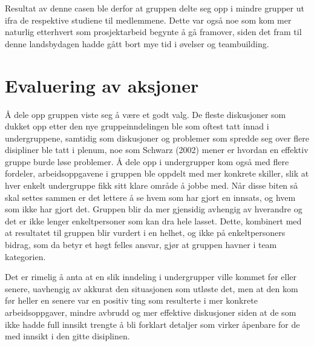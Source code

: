 Resultat av denne casen ble derfor at gruppen delte seg opp i mindre grupper ut ifra de respektive studiene til medlemmene. Dette var også noe som kom mer naturlig etterhvert som prosjektarbeid begynte å gå framover, siden det fram til denne landsbydagen hadde gått bort mye tid i øvelser og teambuilding.

\section{Evaluering av aksjoner}
Å dele opp gruppen viste seg å være et godt valg. De fleste diskusjoner som dukket opp etter den nye gruppeinndelingen ble som oftest tatt innad i undergruppene, samtidig som diskusjoner og problemer som spredde seg over flere disipliner ble tatt i plenum, noe som Schwarz (2002) mener er hvordan en effektiv gruppe burde løse problemer. \cite{Artikkel3} Å dele opp i undergrupper kom også med flere fordeler, arbeidsoppgavene i gruppen ble oppdelt med mer konkrete skiller, slik at hver enkelt undergruppe fikk sitt klare område å jobbe med. Når disse biten så skal settes sammen er det lettere å se hvem som har gjort en innsats, og hvem som ikke har gjort det. Gruppen blir da mer gjensidig avhengig av hverandre og det er ikke lenger enkeltpersoner som kan dra hele lasset. Dette, kombinert med at resultatet til gruppen blir vurdert i en helhet, og ikke på enkeltpersoners bidrag, som da betyr et høgt felles ansvar, gjør at gruppen havner i team kategorien. \cite{Artikkel4}


Det er rimelig å anta at en slik inndeling i undergrupper ville kommet før eller senere, uavhengig av akkurat den situasjonen som utløste det, men at den kom før heller en senere var en positiv ting som resulterte i mer konkrete arbeidsoppgaver, mindre avbrudd og mer effektive diskusjoner siden at de som ikke hadde full innsikt trengte å bli forklart detaljer som virker åpenbare for de med innsikt i den gitte disiplinen.